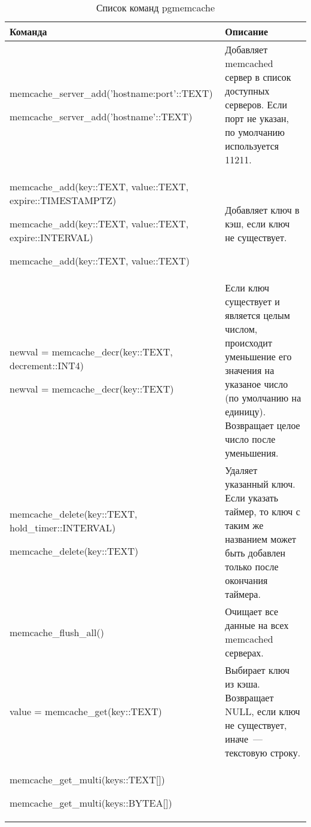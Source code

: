 \begin{table}[h]
\caption{Список команд pgmemcache}
\label{tabular:pgmemcache1}
\begin{tabular}{| >{\raggedright\scriptsize}p{7cm}| >{\scriptsize}p{7cm} |}
\hline
Команда & Описание\\
\hline
memcache\_server\_add('hostname:port'::TEXT)

memcache\_server\_add('hostname'::TEXT)
&
Добавляет memcached сервер в список доступных серверов. Если порт не указан, по умолчанию используется 11211.\\

\hline

memcache\_add(key::TEXT, value::TEXT, expire::TIMESTAMPTZ)

memcache\_add(key::TEXT, value::TEXT, expire::INTERVAL)

memcache\_add(key::TEXT, value::TEXT)
&
Добавляет ключ в кэш, если ключ не существует.\\

\hline

newval = memcache\_decr(key::TEXT, decrement::INT4)

newval = memcache\_decr(key::TEXT)
&
Если ключ существует и является целым числом, происходит уменьшение
его значения на указаное число (по умолчанию на единицу).
Возвращает целое число после уменьшения.\\

\hline

memcache\_delete(key::TEXT, hold\_timer::INTERVAL)

memcache\_delete(key::TEXT)

&
Удаляет указанный ключ. Если указать таймер, то ключ с таким же названием может
быть добавлен только после окончания таймера.\\

\hline

memcache\_flush\_all()

&
Очищает все данные на всех memcached серверах.\\

\hline

value = memcache\_get(key::TEXT)

&
Выбирает ключ из кэша. Возвращает NULL, если ключ не существует, иначе~--- текстовую строку.\\

\hline

memcache\_get\_multi(keys::TEXT[])

memcache\_get\_multi(keys::BYTEA[])


\end{tabular}
\end{table}
